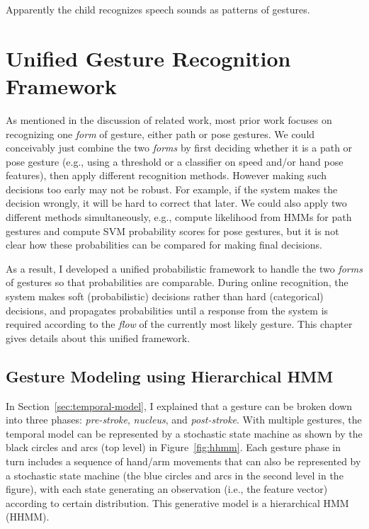 \begin{savequote}
Apparently the child recognizes speech sounds as patterns of gestures.
\end{savequote}
\chapter{Unified Gesture Recognition Framework}

As mentioned in the discussion of related work, most prior work
focuses on recognizing one \textit{form} of gesture, either path or pose
gestures.
We could conceivably just combine the two \textit{forms} by first deciding
whether it is a path or pose gesture (e.g., using a threshold or a
classifier on speed and/or hand pose features), then apply different recognition
methods.
However making such decisions too early may not be robust. For example, if the
system makes the decision wrongly, it will be hard to correct that later.
We could also apply two different methods simultaneously, e.g., compute likelihood
from HMMs for path gestures and compute SVM probability scores for pose
gestures, but it is not clear how these probabilities can be compared for making
final decisions.

As a result, I developed a unified probabilistic framework to handle the two
\textit{forms} of gestures so that probabilities are comparable. During online
recognition, the system makes soft (probabilistic) decisions rather than hard
(categorical) decisions, and propagates probabilities until a response
from the system is required according to the \textit{flow} of the currently most
likely gesture.
This chapter gives details about this unified framework.

\section{Gesture Modeling using Hierarchical HMM}
In Section~\ref{sec:temporal-model}, I explained that 
a gesture can be broken down into three phases: \textit{pre-stroke},
\textit{nucleus}, and \textit{post-stroke}. With multiple gestures, the temporal model can be
represented by a stochastic state machine as shown by the black circles and arcs
 (top level) in Figure~\ref{fig:hhmm}.
Each gesture phase in turn includes a sequence of hand/arm movements that can 
also be represented by a stochastic state machine (the blue circles and arcs in
the second level in the figure), with each state generating an observation
(i.e., the feature vector) according to certain distribution.
This generative model is a hierarchical HMM (HHMM). 

